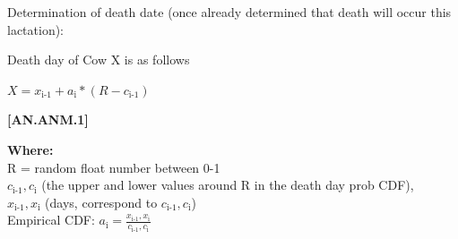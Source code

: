 \documentclass{article}
\begin{document}
\begin{refsection}
Determination of death date (once already determined that death will occur this lactation): 
\vspace{0.2cm}

Death day of Cow X is as follows
\begin{center}
    \(X = x_{\text{i-1}} + a_{\text{i}} * (R - c_{\text{i-1}})\)
\end{center}
\vspace{0.5cm}

            {\raggedleft \textbf{[AN.ANM.1]}\par}
    
\vspace{0.25cm}
\textbf{Where:} \\

\hspace*{1.5em} R = random float number between 0-1  \\

\hspace*{1.5em} $c_{\text{i-1}},c_{\text{i}}$ (the upper and lower values around R in the death day prob CDF),  \\

\hspace*{1.5em} $x_{\text{i-1}},x_{\text{i}}$ (days, correspond to $c_{\text{i-1}},c_{\text{i}}$) \\

\hspace*{1.5em} Empirical CDF: $a_{\text{i}} = \frac{x_{\text{i-1}},x_{\text{i}}}{c_{\text{i-1}},c_{\text{i}}}$ \\


\end{refsection}
\end{document}
